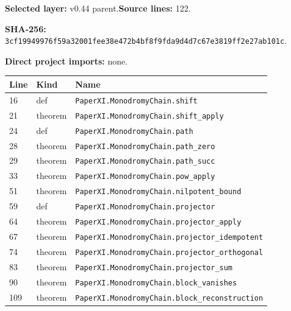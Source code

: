 \documentclass[10pt,oneside]{book}
\begin{document}
\textbf{Selected layer:} v0.44 parent.\quad\textbf{Source lines:} 122.\par\textbf{SHA-256:} {\scriptsize\nolinkurl{3cf19949976f59a32001fee38e472b4bf8f9fda9d4d7c67e3819ff2e27ab101c}}.


\textbf{Direct project imports:} none.

\begin{longtable}{@{}p{}p{}p{}@{}}\toprule Line&Kind&Name\\\midrule\endhead

16&def&\nolinkurl{PaperXI.MonodromyChain.shift}\\

21&theorem&\nolinkurl{PaperXI.MonodromyChain.shift_apply}\\

24&def&\nolinkurl{PaperXI.MonodromyChain.path}\\

28&theorem&\nolinkurl{PaperXI.MonodromyChain.path_zero}\\

29&theorem&\nolinkurl{PaperXI.MonodromyChain.path_succ}\\

33&theorem&\nolinkurl{PaperXI.MonodromyChain.pow_apply}\\

51&theorem&\nolinkurl{PaperXI.MonodromyChain.nilpotent_bound}\\

59&def&\nolinkurl{PaperXI.MonodromyChain.projector}\\

64&theorem&\nolinkurl{PaperXI.MonodromyChain.projector_apply}\\

67&theorem&\nolinkurl{PaperXI.MonodromyChain.projector_idempotent}\\

74&theorem&\nolinkurl{PaperXI.MonodromyChain.projector_orthogonal}\\

83&theorem&\nolinkurl{PaperXI.MonodromyChain.projector_sum}\\

90&theorem&\nolinkurl{PaperXI.MonodromyChain.block_vanishes}\\

109&theorem&\nolinkurl{PaperXI.MonodromyChain.block_reconstruction}\\

\bottomrule\end{longtable}
\end{document}
